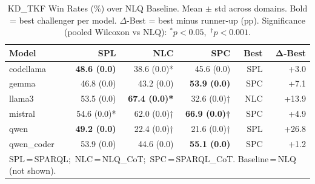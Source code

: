 \begin{table}[t]
\centering
\small
\caption{KD\_TKF Win Rates (\%) over NLQ Baseline. Mean $\pm$ std across domains. Bold = best challenger per model. $\Delta$-Best = best minus runner-up (pp). Significance (pooled Wilcoxon vs NLQ): $^{*}p{<}0.05$,\ $^{\dagger}p{<}0.001$.}
\label{tab:rq1_winrates}
\setlength{\tabcolsep}{5pt}
\begin{tabular}{lrrrrr}
\toprule
\textbf{Model} & \textbf{SPL} & \textbf{NLC} & \textbf{SPC} & \textbf{Best} & $\boldsymbol{\Delta}$\textbf{-Best} \\
\midrule
codellama & \textbf{48.6 (0.0)} & 38.6 (0.0)* & 45.6 (0.0) & SPL & +3.0 \\
gemma & 46.8 (0.0) & 43.2 (0.0) & \textbf{53.9 (0.0)} & SPC & +7.1 \\
llama3 & 53.5 (0.0) & \textbf{67.4 (0.0)*} & 32.6 (0.0)† & NLC & +13.9 \\
mistral & 54.6 (0.0)* & 62.0 (0.0)† & \textbf{66.9 (0.0)†} & SPC & +4.9 \\
qwen & \textbf{49.2 (0.0)} & 22.4 (0.0)† & 21.6 (0.0)† & SPL & +26.8 \\
qwen_coder & 53.9 (0.0) & 44.6 (0.0) & \textbf{55.1 (0.0)} & SPC & +1.2 \\
\bottomrule
\multicolumn{6}{l}{\footnotesize SPL\,=\,SPARQL;\  NLC\,=\,NLQ\_CoT;\  SPC\,=\,SPARQL\_CoT. Baseline\,=\,NLQ (not shown).} \\
\end{tabular}
\end{table}